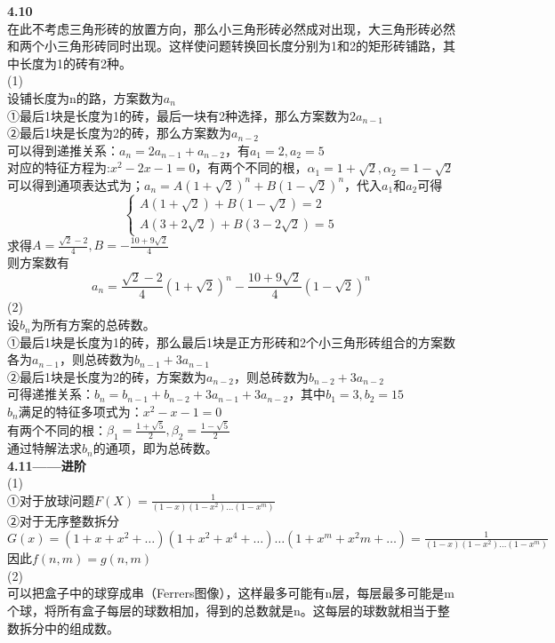 \documentclass[a4paper,12pt]{article}
\begin{document}
	\noindent
	\textbf{4.10}\\
	在此不考虑三角形砖的放置方向，那么小三角形砖必然成对出现，大三角形砖必然和两个小三角形砖同时出现。这样使问题转换回长度分别为1和2的矩形砖铺路，其中长度为1的砖有2种。\\
	(1)\\
	设铺长度为n的路，方案数为$a_{n}$\\
	①最后1块是长度为1的砖，最后一块有2种选择，那么方案数为$2a_{n-1}$\\
	②最后1块是长度为2的砖，那么方案数为$a_{n-2}$\\
	可以得到递推关系：$a_{n}=2a_{n-1}+a_{n-2}$，\qquad 有$a_1=2,a_2=5$\\
	对应的特征方程为:$x^2-2x-1=0$，有两个不同的根，$\alpha_1=1+\sqrt{2},\alpha_2=1-\sqrt{2}$\\
	可以得到通项表达式为；$a_n=A(1+\sqrt{2})^n+B(1-\sqrt{2})^n$，代入$a_1$和$a_2$可得\\
	$$
	\begin{cases}
		A(1+\sqrt{2})+B(1-\sqrt{2})=2\\
		A(3+2\sqrt{2})+B(3-2\sqrt{2})=5
	\end{cases}
	$$
	求得$A=\frac{\sqrt{2}-2}{4},B=-\frac{10+9\sqrt{2}}{4}$\\
	则方案数有\[
		a_n=\frac{\sqrt{2}-2}{4}(1+\sqrt{2})^n-\frac{10+9\sqrt{2}}{4}(1-\sqrt{2})^n
	\]
	(2)\\
	设$b_n$为所有方案的总砖数。\\
	①最后1块是长度为1的砖，那么最后1块是正方形砖和2个小三角形砖组合的方案数各为$a_{n-1}$，则总砖数为$b_{n-1}+3a_{n-1}$\\
	②最后1块是长度为2的砖，方案数为$a_{n-2}$，则总砖数为$b_{n-2}+3a_{n-2}$\\
	可得递推关系：$b_{n}=b_{n-1}+b_{n-2}+3a_{n-1}+3a_{n-2}$，其中$b_1=3,b_2=15$\\
	$b_n$满足的特征多项式为：$x^2-x-1=0$\\
	有两个不同的根：$\beta_1=\frac{1+\sqrt{5}}{2},\beta_2=\frac{1-\sqrt{5}}{2}$\\
	通过特解法求$b_n$的通项，即为总砖数。
	\\
	
	\noindent
	\textbf{4.11——进阶}\\
	(1)\\
	①对于放球问题$F(X)=\frac{1}{(1-x)(1-x^2)\dots(1-x^m)}$\\
	②对于无序整数拆分$G(x)=(1+x+x^2+\dots)(1+x^2+x^4+\dots)\dots(1+x^m+x^2m+\dots)=\frac{1}{(1-x)(1-x^2)\dots(1-x^m)}$
	因此$f(n,m)=g(n,m)$\\
	(2)\\
	可以把盒子中的球穿成串（Ferrers图像），这样最多可能有n层，每层最多可能是m个球，将所有盒子每层的球数相加，得到的总数就是n。这每层的球数就相当于整数拆分中的组成数。\\
	
\end{document}
